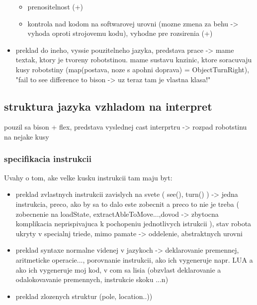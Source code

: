 \documentclass[a4paper,11pt,final]{report}
\begin{document}
\begin{itemize}
\begin{itemize}
\item prenositelnost (+)
\item kontrola nad kodom na softwarovej urovni (mozne zmena za behu -> vyhoda oproti strojovemu kodu), vyhodne pre rozsirenia (+)
\end{itemize}
\item preklad do ineho, vyssie pouzitelneho jazyka, predstava prace -> mame textak, ktory je tvoreny robotstinou. mame sustavu knzinic, ktore soracuvaju kusy robotstiny (map(postava, noze s apohni doprava) = ObjectTurnRight), "fail to see difference to bison -> uz teraz tam je vlastna klasa!"
\end{itemize}
\subsection{struktura jazyka vzhladom na interpret}
pouzil sa bison + flex, predstava vyslednej cast interprtru -> rozpad robotstinu na nejake kusy
\subsubsection{specifikacia instrukcii}
Uvahy o tom, ake velke kusku instrukcii tam maju byt:
\begin{itemize}
\item preklad zvlastnych instrukcii zavislych na svete ( see(), turn() ) -> jedna instrukcia, preco, ako by sa to dalo este zobecnit a preco to nie je treba ( zobecnenie na loadState, extractAbleToMove...,dovod -> zbytocna komplikacia neprispivajuca k pochopeniu jednotlivych istrukcii ), stav robota ukryty v specialnj triede, mimo pamate -> oddelenie, abstraktnych urovni
\item preklad syntaxe normalne videnej v jazykoch -> deklarovanie premennej, aritmeticke operacie..., porovnanie instrukcii, ako ich vygeneruje napr. LUA a ako ich vygeneruje moj kod, v com sa lisia (obzvlast deklarovanie a odalokovavanie premennych, instrukcie skoku ...n)
\item preklad zlozenych struktur (pole, location..))
\end{itemize}
\end{document}
